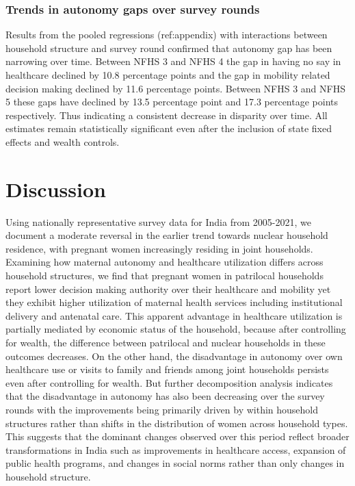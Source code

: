 \documentclass[12pt]{article}
\begin{document}
\subsubsection{Trends in autonomy gaps over survey rounds}

Results from the pooled regressions (ref:appendix) with interactions between household structure and survey round confirmed that autonomy gap has been narrowing over time. Between NFHS 3 and NFHS 4 the gap in having no say in healthcare declined by 10.8 percentage points and the gap in mobility related decision making declined by 11.6 percentage points. Between NFHS 3 and NFHS 5 these gaps have declined by 13.5 percentage point and 17.3 percentage points respectively. Thus indicating a consistent decrease in disparity over time. All estimates remain statistically significant even after the inclusion of state fixed effects and wealth controls. 
 

\section{Discussion}

Using nationally representative survey data for India from 2005-2021, we document a moderate reversal in the earlier trend towards nuclear household residence, with pregnant women increasingly residing in joint households.  Examining how maternal autonomy and healthcare utilization differs across household structures, we find that pregnant women in patrilocal households report lower decision making authority over their healthcare and mobility yet they exhibit higher utilization of maternal health services including institutional delivery and antenatal care. This apparent advantage in healthcare utilization is partially mediated by economic status of the household, because after controlling for wealth, the difference between patrilocal and nuclear households in these outcomes decreases. On the other hand, the disadvantage in autonomy over own healthcare use or visits to family and friends among joint households persists even after controlling for wealth.  But further decomposition analysis indicates that the disadvantage in autonomy has also been decreasing over the survey rounds with the improvements being primarily driven by within household structures rather than shifts in the distribution of women across household types. This suggests that the dominant changes observed over this period reflect broader transformations in India such as improvements in healthcare access, expansion of public health programs, and changes in social norms rather than only changes in household structure. 
\end{document}
